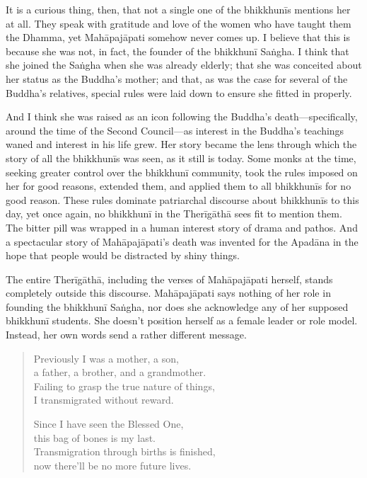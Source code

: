\documentclass[12pt,openany]{book}%
\begin{document}
It is a curious thing, then, that not a single one of the \textsanskrit{bhikkhunīs} mentions her at all. They speak with gratitude and love of the women who have taught them the Dhamma, yet \textsanskrit{Mahāpajāpati} somehow never comes up. I believe that this is because she was not, in fact, the founder of the \textsanskrit{bhikkhunī} \textsanskrit{Saṅgha}. I think that she joined the \textsanskrit{Saṅgha} when she was already elderly; that she was conceited about her status as the Buddha’s mother; and that, as was the case for several of the Buddha’s relatives, special rules were laid down to ensure she fitted in properly.

And I think she was raised as an icon following the Buddha’s death—specifically, around the time of the Second Council—as interest in the Buddha’s teachings waned and interest in his life grew. Her story became the lens through which the story of all the \textsanskrit{bhikkhunīs} was seen, as it still is today. Some monks at the time, seeking greater control over the \textsanskrit{bhikkhunī} community, took the rules imposed on her for good reasons, extended them, and applied them to all \textsanskrit{bhikkhunīs} for no good reason. These rules dominate patriarchal discourse about \textsanskrit{bhikkhunīs} to this day, yet once again, no \textsanskrit{bhikkhunī} in the \textsanskrit{Therīgāthā} sees fit to mention them. The bitter pill was wrapped in a human interest story of drama and pathos. And a spectacular story of \textsanskrit{Mahāpajāpati}’s death was invented for the \textsanskrit{Apadāna} in the hope that people would be distracted by shiny things.

The entire \textsanskrit{Therīgāthā}, including the verses of \textsanskrit{Mahāpajāpati} herself, stands completely outside this discourse. \textsanskrit{Mahāpajāpati} says nothing of her role in founding the \textsanskrit{bhikkhunī} \textsanskrit{Saṅgha}, nor does she acknowledge any of her supposed \textsanskrit{bhikkhunī} students. She doesn’t position herself as a female leader or role model. Instead, her own words send a rather different message.

\begin{verse}%
Previously I was a mother, a son, \\
a father, a brother, and a grandmother. \\
Failing to grasp the true nature of things, \\
I transmigrated without reward.

Since I have seen the Blessed One, \\
this bag of bones is my last. \\
Transmigration through births is finished, \\
now there’ll be no more future lives.

%
\end{verse}
\end{document}
